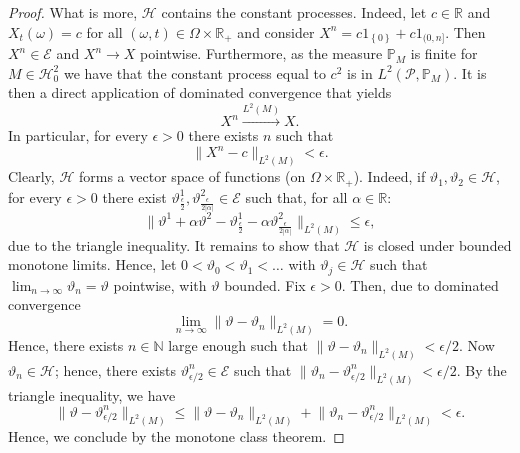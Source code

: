 \documentclass[11pt,a4paper,twoside,openany]{report}
\numberwithin{equation}{section}
\theoremstyle{plain} %
\theoremstyle{definition} %
\theoremstyle{remark} %
\begin{document}
\begin{proof}
    What is more, \(\mathcal{H}\) contains the constant processes. Indeed, let \(c\in\mathbb{R}\) and  \(X_t(\omega)=c\) for all \((\omega,t)\in\Omega\times \mathbb{R}_+\) and consider \(X^n=c1_{\left\{0\right\}}+c1_{(0,n]}\). Then \(X^n\in \mathcal{E}\) and \(X^n\to X\) pointwise. Furthermore, as the measure \(\mathbb{P}_M\) is finite for \(M\in\mathcal{H}_0^2\) we have that the constant process equal to \(c^2\) is in \(L^2(\mathcal{P},\mathbb{P}_M)\). It is then a direct application of dominated convergence that yields 
    \begin{equation*}
        X^n\overset{L^2(M)}{\to}X.
    \end{equation*}
In particular, for every \(\epsilon>0\) there exists \(n\) such that 
\begin{equation*}
    \lVert X^n-c\rVert_{L^2(M)}<\epsilon.
\end{equation*}
Clearly, \(\mathcal{H}\) forms a vector space of functions (on \(\Omega\times\mathbb{R}_+\)). Indeed, if \(\vartheta_1,\vartheta_2\in\mathcal{H}\), for every \(\epsilon>0\) there exist \(\vartheta^1_{\frac{\epsilon}{2}},\vartheta^2_{\frac{\epsilon}{2|\alpha|}}\in\mathcal{E}\) such that, for all \(\alpha\in\mathbb{R}\):
    \begin{equation*}
        \big\lVert \vartheta^1+\alpha \vartheta^2- \vartheta^1_{\frac{\epsilon}{2}}-\alpha \vartheta^2_{\frac{\epsilon}{2|\alpha|}} \big\rVert_{L^2(M)}\leq \epsilon,
    \end{equation*}
    due to the triangle inequality.
 It remains to show that \(\mathcal{H}\) is closed under bounded monotone limits. Hence, let \(0<\vartheta_0<\vartheta_1<\dots\) with \(\vartheta_j\in\mathcal{H}\) such that \(\lim_{n\to\infty}\vartheta_n = \vartheta\) pointwise, with \(\vartheta\) bounded. Fix \(\epsilon>0\). Then, due to dominated convergence 
    \begin{equation*}
        \lim_{n\to\infty}\lVert \vartheta-\vartheta_n\rVert_{L^2(M)}=0.
    \end{equation*}
    Hence, there exists \(n\in\mathbb{N}\) large enough such that \(\lVert \vartheta-\vartheta_n\rVert_{L^2(M)}<\epsilon/2\). Now \(\vartheta_n\in\mathcal{H}\); hence, there exists \(\vartheta^n_{\epsilon/2}\in \mathcal{E}\) such that \(\lVert \vartheta_n-\vartheta^n_{\epsilon/2}\rVert_{L^2(M)}<\epsilon/2\). By the triangle inequality, we have
    \begin{equation}
        \lVert \vartheta-\vartheta^n_{\epsilon/2}\rVert_{L^2(M)}\leq\lVert \vartheta-\vartheta_n\rVert_{L^2(M)}+\lVert \vartheta_n-\vartheta^n_{\epsilon/2}\rVert_{L^2(M)}<\epsilon.
    \end{equation}
 Hence, we conclude by the monotone class theorem. 
\end{proof}
\end{document}
